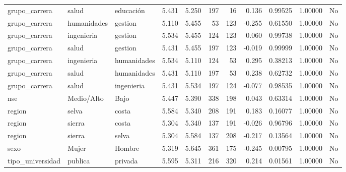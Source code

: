 \documentclass[
  letterpaper,
  DIV=11,
  numbers=noendperiod]{scrartcl}
\begin{document}
\begin{table}
\begin{tabular*}{\linewidth}{@{\extracolsep{\fill}}lllrrrrrrrl}
grupo\_carrera & salud & educación & 5.431 & 5.250 & 197 & 16 & 0.136 & 0.99525 & 1.00000 & No \\ 
grupo\_carrera & humanidades & gestion & 5.110 & 5.455 & 53 & 123 & -0.255 & 0.61550 & 1.00000 & No \\ 
grupo\_carrera & ingenieria & gestion & 5.534 & 5.455 & 124 & 123 & 0.060 & 0.99738 & 1.00000 & No \\ 
grupo\_carrera & salud & gestion & 5.431 & 5.455 & 197 & 123 & -0.019 & 0.99999 & 1.00000 & No \\ 
grupo\_carrera & ingenieria & humanidades & 5.534 & 5.110 & 124 & 53 & 0.295 & 0.38213 & 1.00000 & No \\ 
grupo\_carrera & salud & humanidades & 5.431 & 5.110 & 197 & 53 & 0.238 & 0.62732 & 1.00000 & No \\ 
grupo\_carrera & salud & ingenieria & 5.431 & 5.534 & 197 & 124 & -0.077 & 0.98535 & 1.00000 & No \\ 
nse & Medio/Alto & Bajo & 5.447 & 5.390 & 338 & 198 & 0.043 & 0.63314 & 1.00000 & No \\ 
region & selva & costa & 5.584 & 5.340 & 208 & 191 & 0.183 & 0.16077 & 1.00000 & No \\ 
region & sierra & costa & 5.304 & 5.340 & 137 & 191 & -0.026 & 0.96796 & 1.00000 & No \\ 
region & sierra & selva & 5.304 & 5.584 & 137 & 208 & -0.217 & 0.13564 & 1.00000 & No \\ 
sexo & Mujer & Hombre & 5.319 & 5.645 & 361 & 175 & -0.245 & 0.00795 & 1.00000 & No \\ 
tipo\_universidad & publica & privada & 5.595 & 5.311 & 216 & 320 & 0.214 & 0.01561 & 1.00000 & No \\ 
\bottomrule
\end{tabular*}
\end{table}
\end{document}
